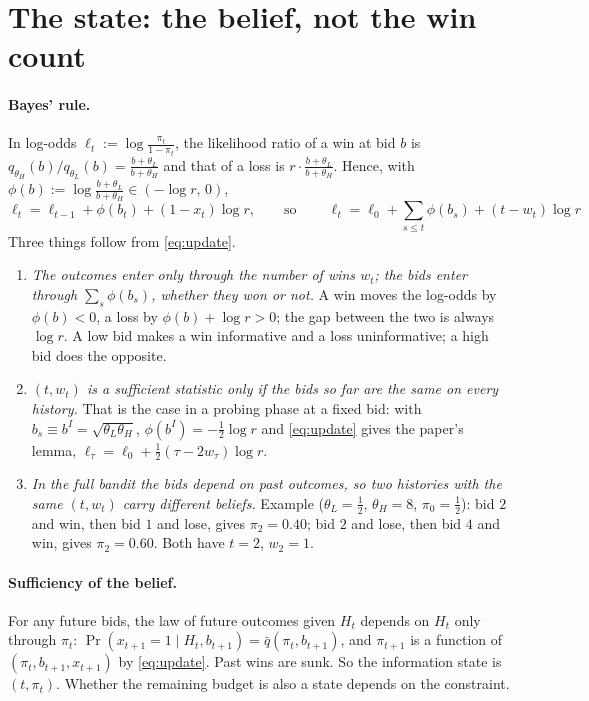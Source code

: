 \documentclass[11pt]{article}
\newcommand{\qbar}{\bar q}
\theoremstyle{remark}
\begin{document}
\section{The state: the belief, not the win count}

\paragraph{Bayes' rule.} In log-odds $\ell_t:=\log\frac{\pi_t}{1-\pi_t}$, the likelihood ratio of a win at bid $b$ is
$q_{\theta_H}(b)/q_{\theta_L}(b)=\frac{b+\theta_L}{b+\theta_H}$ and that of a loss is $r\cdot\frac{b+\theta_L}{b+\theta_H}$. Hence, with
$\phi(b):=\log\frac{b+\theta_L}{b+\theta_H}\in(-\log r,\,0)$,
\begin{equation}\label{eq:update}
\ell_t=\ell_{t-1}+\phi(b_t)+(1-x_t)\log r,
\qquad\text{so}\qquad
\boxed{\ \ell_t=\ell_0+\sum_{s\le t}\phi(b_s)+(t-w_t)\log r\ }
\end{equation}
Three things follow from \eqref{eq:update}.
\begin{enumerate}
\item \emph{The outcomes enter only through the number of wins $w_t$; the bids enter through $\sum_s\phi(b_s)$,
whether they won or not.} A win moves the log-odds by $\phi(b)<0$, a loss by $\phi(b)+\log r>0$; the gap between
the two is always $\log r$. A low bid makes a win informative and a loss uninformative; a high bid does the opposite.
\item \emph{$(t,w_t)$ is a sufficient statistic only if the bids so far are the same on every history.} That is the
case in a probing phase at a fixed bid: with $b_s\equiv b^I=\sqrt{\theta_L\theta_H}$, $\phi(b^I)=-\tfrac12\log r$ and
\eqref{eq:update} gives the paper's lemma, $\ell_\tau=\ell_0+\tfrac12(\tau-2w_\tau)\log r$.
\item \emph{In the full bandit the bids depend on past outcomes, so two histories with the same $(t,w_t)$ carry
different beliefs.} Example ($\theta_L=\tfrac12$, $\theta_H=8$, $\pi_0=\tfrac12$): bid $2$ and win, then bid $1$ and lose, gives
$\pi_2=0.40$; bid $2$ and lose, then bid $4$ and win, gives $\pi_2=0.60$. Both have $t=2$, $w_2=1$.
\end{enumerate}

\paragraph{Sufficiency of the belief.} For any future bids, the law of future outcomes given $H_t$ depends on $H_t$
only through $\pi_t$: $\Pr(x_{t+1}=1\mid H_t,b_{t+1})=\qbar(\pi_t,b_{t+1})$, and $\pi_{t+1}$ is a function of
$(\pi_t,b_{t+1},x_{t+1})$ by \eqref{eq:update}. Past wins are sunk. So the information state is $(t,\pi_t)$. Whether the
remaining budget is also a state depends on the constraint.
\end{document}
